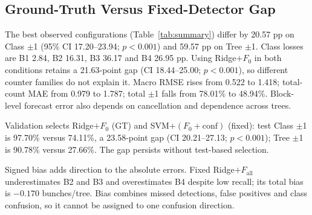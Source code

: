 \documentclass[conference,a4paper]{IEEEtran}
\begin{document}
\subsection{Ground-Truth Versus Fixed-Detector Gap}
\label{sec:gap}
The best observed configurations (Table~\ref{tab:summary}) differ by 20.57 pp
on Class $\pm$1 (95\% CI 17.20--23.94; $p<0.001$) and 59.57 pp on Tree
$\pm$1. Class losses are B1 2.84, B2 16.31, B3 36.17 and B4 26.95 pp.
Using Ridge$+F_0$ in both conditions retains a 21.63-point gap
(CI 18.44--25.00; $p<0.001$), so different counter families do not explain it.
Macro RMSE rises from 0.522 to 1.418; total-count MAE from 0.979 to 1.787;
total $\pm$1 falls from 78.01\% to 48.94\%. Block-level forecast error also
depends on cancellation and dependence across trees.

Validation selects Ridge$+F_0$ (GT) and SVM$+(F_0+\mathrm{conf})$ (fixed):
test Class $\pm$1 is 97.70\% versus 74.11\%, a 23.58-point gap
(CI 20.21--27.13; $p<0.001$); Tree $\pm$1 is 90.78\% versus 27.66\%.
The gap persists without test-based selection.

Signed bias adds direction to the absolute errors. Fixed Ridge$+F_{\text{all}}$
underestimates B2 and B3 and overestimates B4 despite low recall; its total bias
is $-0.170$ bunches/tree. Bias combines missed detections, false positives and
class confusion, so it cannot be assigned to one confusion direction.
\end{document}

